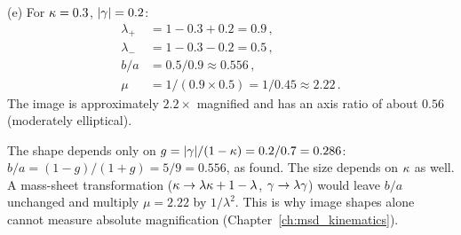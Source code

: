 (e) For $\kappa = 0.3$, $|\gamma| = 0.2$:
\begin{align*}
    \lambda_+ &= 1 - 0.3 + 0.2 = 0.9 \,, \\
    \lambda_- &= 1 - 0.3 - 0.2 = 0.5 \,, \\
    b/a &= 0.5/0.9 \approx 0.556 \,, \\
    \mu &= 1/(0.9 \times 0.5) = 1/0.45 \approx 2.22 \,.
\end{align*}
The image is approximately $2.2\times$ magnified and has an axis ratio
of about $0.56$ (moderately elliptical). \checkmark
\begin{annotation}
The shape depends only on $g = |\gamma|/(1 - \kappa) = 0.2/0.7 = 0.286$:
$b/a = (1 - g)/(1 + g) = 5/9 = 0.556$, as found. The size depends on
$\kappa$ as well. A mass-sheet transformation
($\kappa \to \lambda\kappa + 1 - \lambda$, $\gamma \to \lambda\gamma$) would
leave $b/a$ unchanged and multiply $\mu = 2.22$ by $1/\lambda^2$. This is
why image shapes alone cannot measure absolute magnification
(Chapter~\ref{ch:msd_kinematics}).
\end{annotation}
